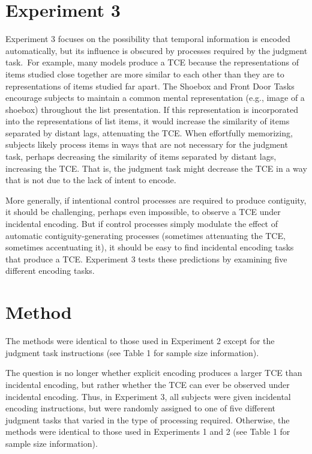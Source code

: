 \documentclass[man,natbib,floatsintext]{apa6} %
\begin{document}
\section{Experiment 3}
Experiment 3 focuses on the possibility that temporal information is encoded automatically, but its influence is obscured by processes required by the judgment task.\color{black}~For example, many models produce a TCE because the representations of items studied close together are more similar to each other than they are to representations of items studied far apart. The Shoebox and Front Door Tasks encourage subjects to maintain a common mental representation (e.g., image of a shoebox) throughout the list presentation. If this representation is incorporated into the representations of list items, it would increase the similarity of items separated by distant lags, attenuating the TCE. When effortfully memorizing, subjects likely process items in ways that are not necessary for the judgment task, perhaps decreasing the similarity of items separated by distant lags, increasing the TCE. That is, the judgment task might decrease the TCE in a way that is not due to the lack of intent to encode.

More generally, if intentional control processes are required to produce contiguity, it should be challenging, perhaps even impossible, to observe a TCE under incidental encoding. But if control processes simply modulate the effect of automatic contiguity-generating processes (sometimes attenuating the TCE, sometimes accentuating it), it should be easy to find incidental encoding tasks that produce a TCE. Experiment 3 tests these predictions by examining five different encoding tasks.

\section{Method}
The methods were identical to those used in Experiment 2 except for the judgment task instructions (see Table 1 for sample size information).

The question is no longer whether explicit encoding produces a larger TCE than incidental encoding, but rather whether the TCE can ever be observed under incidental encoding. Thus, in Experiment 3, all subjects were given incidental encoding instructions, but were randomly assigned to one of five different judgment tasks that varied in the type of processing required. Otherwise, the methods were identical to those used in Experiments 1 and 2 (see Table 1 for sample size information).
\end{document}
